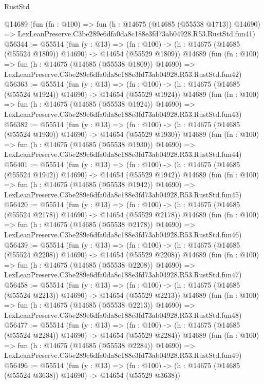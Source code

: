 \begin{lexlean}{RustStd}
\begin{coremodule}
    @14689
    (fun (fn : @100) =>
    fun (h : @14675 (@14685 (@55538 @1713)) @14690) =>
    LexLeanPreserve.C3be289e6dfa0da8c188e3fd73ab04928.R53.RustStd.fun41)
@56344 := @55514
    (fun (y : @13) =>
    (fn : @100) -> (h : @14675 (@14685 (@55524 @1809)) @14690) -> @14654 (@55529 @1809))
    @14689
    (fun (fn : @100) =>
    fun (h : @14675 (@14685 (@55538 @1809)) @14690) =>
    LexLeanPreserve.C3be289e6dfa0da8c188e3fd73ab04928.R53.RustStd.fun42)
@56363 := @55514
    (fun (y : @13) =>
    (fn : @100) -> (h : @14675 (@14685 (@55524 @1924)) @14690) -> @14654 (@55529 @1924))
    @14689
    (fun (fn : @100) =>
    fun (h : @14675 (@14685 (@55538 @1924)) @14690) =>
    LexLeanPreserve.C3be289e6dfa0da8c188e3fd73ab04928.R53.RustStd.fun43)
@56382 := @55514
    (fun (y : @13) =>
    (fn : @100) -> (h : @14675 (@14685 (@55524 @1930)) @14690) -> @14654 (@55529 @1930))
    @14689
    (fun (fn : @100) =>
    fun (h : @14675 (@14685 (@55538 @1930)) @14690) =>
    LexLeanPreserve.C3be289e6dfa0da8c188e3fd73ab04928.R53.RustStd.fun44)
@56401 := @55514
    (fun (y : @13) =>
    (fn : @100) -> (h : @14675 (@14685 (@55524 @1942)) @14690) -> @14654 (@55529 @1942))
    @14689
    (fun (fn : @100) =>
    fun (h : @14675 (@14685 (@55538 @1942)) @14690) =>
    LexLeanPreserve.C3be289e6dfa0da8c188e3fd73ab04928.R53.RustStd.fun45)
@56420 := @55514
    (fun (y : @13) =>
    (fn : @100) -> (h : @14675 (@14685 (@55524 @2178)) @14690) -> @14654 (@55529 @2178))
    @14689
    (fun (fn : @100) =>
    fun (h : @14675 (@14685 (@55538 @2178)) @14690) =>
    LexLeanPreserve.C3be289e6dfa0da8c188e3fd73ab04928.R53.RustStd.fun46)
@56439 := @55514
    (fun (y : @13) =>
    (fn : @100) -> (h : @14675 (@14685 (@55524 @2208)) @14690) -> @14654 (@55529 @2208))
    @14689
    (fun (fn : @100) =>
    fun (h : @14675 (@14685 (@55538 @2208)) @14690) =>
    LexLeanPreserve.C3be289e6dfa0da8c188e3fd73ab04928.R53.RustStd.fun47)
@56458 := @55514
    (fun (y : @13) =>
    (fn : @100) -> (h : @14675 (@14685 (@55524 @2213)) @14690) -> @14654 (@55529 @2213))
    @14689
    (fun (fn : @100) =>
    fun (h : @14675 (@14685 (@55538 @2213)) @14690) =>
    LexLeanPreserve.C3be289e6dfa0da8c188e3fd73ab04928.R53.RustStd.fun48)
@56477 := @55514
    (fun (y : @13) =>
    (fn : @100) -> (h : @14675 (@14685 (@55524 @2284)) @14690) -> @14654 (@55529 @2284))
    @14689
    (fun (fn : @100) =>
    fun (h : @14675 (@14685 (@55538 @2284)) @14690) =>
    LexLeanPreserve.C3be289e6dfa0da8c188e3fd73ab04928.R53.RustStd.fun49)
@56496 := @55514
    (fun (y : @13) =>
    (fn : @100) -> (h : @14675 (@14685 (@55524 @3638)) @14690) -> @14654 (@55529 @3638))

\end{coremodule}
\end{lexlean}
